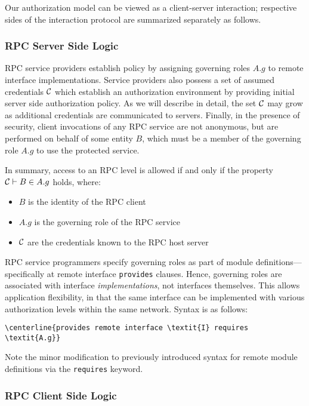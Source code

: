Our authorization model can be viewed as a client-server interaction;
respective sides of the interaction protocol are summarized separately
as follows.

\subsubsection{RPC Server Side Logic}
\label{section-rpc-server-side}

RPC service providers establish policy by assigning governing roles
$A.g$ to remote interface implementations. Service providers also
possess a set of assumed credentials $\mathcal{C}$ which establish an
authorization environment by providing initial server side authorization
policy. As we will describe in detail, the set $\mathcal{C}$ may grow as
additional credentials are communicated to servers. Finally, in the
presence of security, client invocations of any RPC service are not
anonymous, but are performed on behalf of some entity $B$, which must be
a member of the governing role $A.g$ to use the protected service.

In summary, access to an RPC level is allowed if and only if the
property $\mathcal{C} \vdash B \in A.g$ holds, where:
\begin{itemize}
  \item $B$ is the identity of the RPC client
  \item $A.g$ is the governing role of the RPC service
  \item $\mathcal{C}$ are the credentials known to the RPC host server
\end{itemize}
RPC service programmers specify governing roles as part of module
definitions---specifically at remote interface \texttt{provides}
clauses. Hence, governing roles are associated with interface
\emph{implementations}, not interfaces themselves. This allows
application flexibility, in that the same interface can be implemented
with various authorization levels within the same network. Syntax is as
follows:

\begin{Verbatim}[fontsize=\small, commandchars=\\\{\}]
\centerline{provides remote interface \textit{I} requires \textit{A.g}}
\end{Verbatim}

Note the minor modification to previously introduced syntax for remote
module definitions via the \texttt{requires} keyword.

\subsubsection{RPC Client Side Logic}
\label{section-rpc-client-side}

